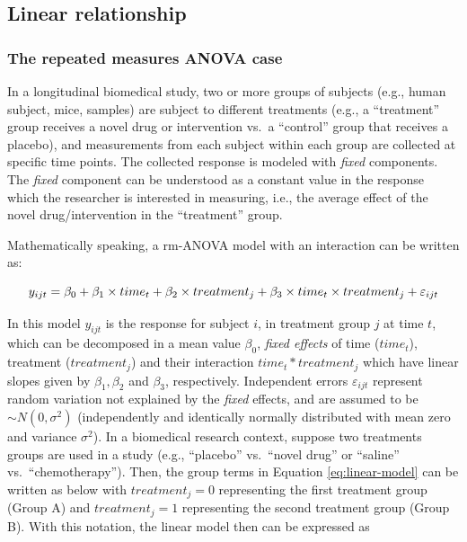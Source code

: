 \documentclass[Royal,times,doublespace,sagev]{sagej}
\begin{document}
\hypertarget{linear-relationship}{%
\subsection{Linear relationship}\label{linear-relationship}}

\hypertarget{the-repeated-measures-anova-case}{%
\subsubsection{The repeated measures ANOVA case}\label{the-repeated-measures-anova-case}}

In a longitudinal biomedical study, two or more groups of subjects (e.g., human subject, mice, samples) are subject to different treatments (e.g., a ``treatment'' group receives a novel drug or intervention vs.~a ``control'' group that receives a placebo), and measurements from each subject within each group are collected at specific time points. The collected response is modeled with \emph{fixed} components. The \emph{fixed} component can be understood as a constant value in the response which the researcher is interested in measuring, i.e., the average effect of the novel drug/intervention in the ``treatment'' group.

Mathematically speaking, a rm-ANOVA model with an interaction can be written as:

\begin{equation}
y_{ijt} = \beta_0+\beta_1 \times time_{t} +\beta_2 \times treatment_{j} +\beta_3 \times time_{t}\times treatment_{j}+\varepsilon_{ijt}\\
\label{eq:linear-model}
\end{equation}

In this model \(y_{ijt}\) is the response for subject \(i\), in treatment group \(j\) at time \(t\), which can be decomposed in a mean value \(\beta_0\), \emph{fixed effects} of time (\(time_t\)), treatment (\(treatment_j\)) and their interaction \(time_t*treatment_j\) which have linear slopes given by \(\beta_1, \beta_2\) and \(\beta_3\), respectively. Independent errors \(\varepsilon_{ijt}\) represent random variation not explained by the \emph{fixed} effects, and are assumed to be \(\sim N(0,\sigma^2)\) (independently and identically normally distributed with mean zero and variance \(\sigma^2\)).
In a biomedical research context, suppose two treatments groups are used in a study (e.g., ``placebo'' vs.~``novel drug'' or ``saline'' vs.~``chemotherapy''). Then, the group terms in Equation \eqref{eq:linear-model} can be written as below with \(treatment_j=0\) representing the first treatment group (Group A) and \(treatment_j=1\) representing the second treatment group (Group B). With this notation, the linear model then can be expressed as
\end{document}
